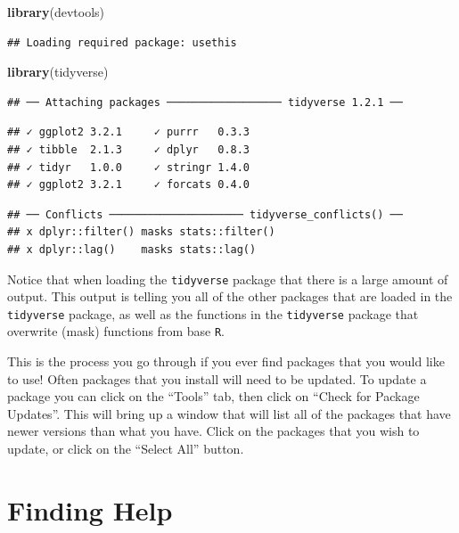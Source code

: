 \documentclass[]{article}
\newenvironment{Shaded}{\begin{snugshade}}{\end{snugshade}}
\newcommand{\KeywordTok}[1]{\textcolor[rgb]{0.13,0.29,0.53}{\textbf{#1}}}
\newcommand{\NormalTok}[1]{#1}
\begin{document}
\begin{Shaded}
\begin{Highlighting}[]
\KeywordTok{library}\NormalTok{(devtools)}
\end{Highlighting}
\end{Shaded}

\begin{verbatim}
## Loading required package: usethis
\end{verbatim}

\begin{Shaded}
\begin{Highlighting}[]
\KeywordTok{library}\NormalTok{(tidyverse)}
\end{Highlighting}
\end{Shaded}

\begin{verbatim}
## ── Attaching packages ────────────────── tidyverse 1.2.1 ──
\end{verbatim}

\begin{verbatim}
## ✓ ggplot2 3.2.1     ✓ purrr   0.3.3
## ✓ tibble  2.1.3     ✓ dplyr   0.8.3
## ✓ tidyr   1.0.0     ✓ stringr 1.4.0
## ✓ ggplot2 3.2.1     ✓ forcats 0.4.0
\end{verbatim}

\begin{verbatim}
## ── Conflicts ───────────────────── tidyverse_conflicts() ──
## x dplyr::filter() masks stats::filter()
## x dplyr::lag()    masks stats::lag()
\end{verbatim}

\vspace{0.25cm}

Notice that when loading the \texttt{tidyverse} package that there is a
large amount of output. This output is telling you all of the other
packages that are loaded in the \texttt{tidyverse} package, as well as
the functions in the \texttt{tidyverse} package that overwrite (mask)
functions from base \texttt{R}.

This is the process you go through if you ever find packages that you
would like to use! Often packages that you install will need to be
updated. To update a package you can click on the ``Tools'' tab, then
click on ``Check for Package Updates''. This will bring up a window that
will list all of the packages that have newer versions than what you
have. Click on the packages that you wish to update, or click on the
``Select All'' button.

\section{Finding Help}\label{finding-help}
\end{document}
